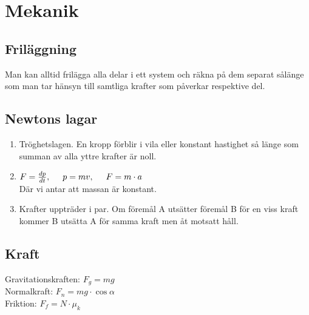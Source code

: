 \section{Mekanik}

\subsection{Friläggning}
Man kan alltid frilägga alla delar i ett system och räkna på dem separat sålänge som man tar hänsyn till samtliga krafter som påverkar respektive del.

\subsection{Newtons lagar}
\begin{enumerate}
    \item
        Tröghetslagen. En kropp förblir i vila eller konstant hastighet så länge som summan av alla yttre krafter är noll.
    \item
        \begin{math}
            F = \frac{dp}{dt}, \hspace*{0.5cm} p = mv, \hspace*{0.5cm} F = m \cdot a
        \end{math} \\[2pt]
        Där vi antar att massan är konstant.
    \item
        Krafter uppträder i par. Om föremål A utsätter föremål B för en viss kraft kommer B utsätta A för samma kraft men åt motsatt håll.
\end{enumerate}

\subsection{Kraft}
Gravitationskraften: 
\begin{math}
    F_g = mg
\end{math} \\[2pt]
Normalkraft:
\begin{math}
    F_n = mg \cdot \cos \alpha
\end{math} \\[2pt]
Friktion:
\begin{math}
    F_f = N \cdot \mu_k
\end{math} \\[2pt]

